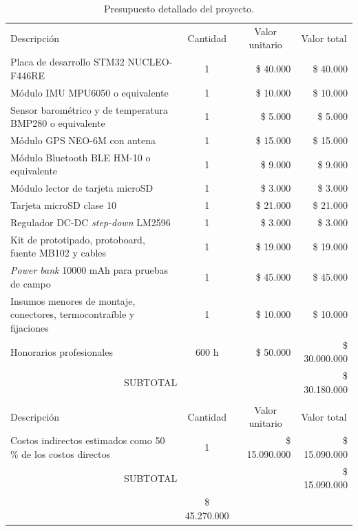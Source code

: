 \documentclass[
11pt, %
]{charter}
\begin{document}
\begin{table}[H]
\centering
\begin{tabularx}{\linewidth}{@{}|X|c|r|r|@{}}
\hline
\rowcolor[HTML]{C0C0C0} 
\multicolumn{4}{|c|}{\cellcolor[HTML]{C0C0C0}COSTOS DIRECTOS} \\ \hline
\rowcolor[HTML]{C0C0C0} 
Descripción &
  \multicolumn{1}{c|}{\cellcolor[HTML]{C0C0C0}Cantidad} &
  \multicolumn{1}{c|}{\cellcolor[HTML]{C0C0C0}Valor unitario} &
  \multicolumn{1}{c|}{\cellcolor[HTML]{C0C0C0}Valor total} \\ \hline
Placa de desarrollo STM32 NUCLEO-F446RE &
  1 &
  \$ 40.000 &
  \$ 40.000 \\ \hline
Módulo IMU MPU6050 o equivalente &
  1 &
  \$ 10.000 &
  \$ 10.000 \\ \hline
Sensor barométrico y de temperatura BMP280 o equivalente &
  1 &
  \$ 5.000 &
  \$ 5.000 \\ \hline
Módulo GPS NEO-6M con antena &
  1 &
  \$ 15.000 &
  \$ 15.000 \\ \hline
Módulo Bluetooth BLE HM-10 o equivalente &
  1 &
  \$ 9.000 &
  \$ 9.000 \\ \hline
Módulo lector de tarjeta microSD &
  1 &
  \$ 3.000 &
  \$ 3.000 \\ \hline
Tarjeta microSD clase 10 &
  1 &
  \$ 21.000 &
  \$ 21.000 \\ \hline
Regulador DC-DC \textit{step-down} LM2596 &
  1 &
  \$ 3.000 &
  \$ 3.000 \\ \hline
Kit de prototipado, protoboard, fuente MB102 y cables &
  1 &
  \$ 19.000 &
  \$ 19.000 \\ \hline
\textit{Power bank} 10000 mAh para pruebas de campo &
  1 &
  \$ 45.000 &
  \$ 45.000 \\ \hline
Insumos menores de montaje, conectores, termocontraíble y fijaciones &
  1 &
  \$ 10.000 &
  \$ 10.000 \\ \hline
Honorarios profesionales &
  600 h &
  \$ 50.000 &
  \$ 30.000.000 \\ \hline
\multicolumn{3}{|c|}{SUBTOTAL} &
  \$ 30.180.000 \\ \hline
\rowcolor[HTML]{C0C0C0} 
\multicolumn{4}{|c|}{\cellcolor[HTML]{C0C0C0}COSTOS INDIRECTOS} \\ \hline
\rowcolor[HTML]{C0C0C0} 
Descripción &
  \multicolumn{1}{c|}{\cellcolor[HTML]{C0C0C0}Cantidad} &
  \multicolumn{1}{c|}{\cellcolor[HTML]{C0C0C0}Valor unitario} &
  \multicolumn{1}{c|}{\cellcolor[HTML]{C0C0C0}Valor total} \\ \hline
Costos indirectos estimados como 50 \% de los costos directos &
  1 &
  \$ 15.090.000 &
  \$ 15.090.000 \\ \hline
\multicolumn{3}{|c|}{SUBTOTAL} &
  \$ 15.090.000 \\ \hline
\rowcolor[HTML]{C0C0C0}
\multicolumn{3}{|c|}{TOTAL} &
  \$ 45.270.000 \\ \hline
\end{tabularx}%
\caption{Presupuesto detallado del proyecto.}
\label{tab:presupuesto}
\end{table}
\end{document}
